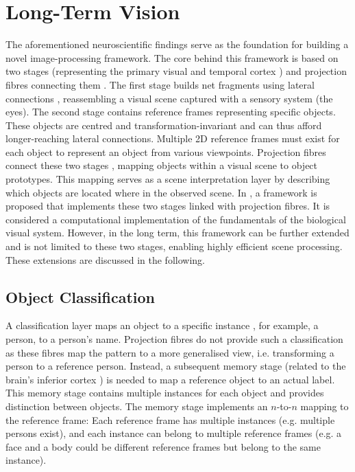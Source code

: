 \section{Long-Term Vision}
The aforementioned neuroscientific findings serve as the foundation for building a novel image-processing framework.
The core behind this framework is based on two stages (representing the primary visual  and temporal cortex ) and projection fibres connecting them .
The first stage builds net fragments  using lateral connections , reassembling a visual scene captured with a sensory system (the eyes).
The second stage contains reference frames representing specific objects. These objects are centred and transformation-invariant and can thus afford longer-reaching lateral connections.
Multiple 2D reference frames must exist for each object to represent an object from various viewpoints.
Projection fibres connect these two stages \cite{tanigawa_organization_2005, greig_molecular_2013}, mapping objects within a visual scene to object prototypes.
This mapping serves as a scene interpretation layer by describing which objects are located where in the observed scene.
In , a framework is proposed that implements these two stages linked with projection fibres.
It is considered a computational implementation of the fundamentals of the biological visual system.
However, in the long term, this framework can be further extended and is not limited to these two stages, enabling highly efficient scene processing.
These extensions are discussed in the following.

\subsection{Object Classification}
A classification layer maps an object to a specific instance , for example, a person, to a person's name. Projection fibres do not provide such a classification as these fibres map the pattern to a more generalised view, i.e. transforming a person to a reference person. Instead, a subsequent memory stage (related to the brain's inferior cortex ) is needed to map a reference object to an actual label.
This memory stage contains multiple instances for each object and provides distinction between objects. The memory stage implements an $n$-to-$n$ mapping to the reference frame: Each reference frame has multiple instances (e.g. multiple persons exist), and each instance can belong to multiple reference frames (e.g. a face and a body could be different reference frames but belong to the same instance).

